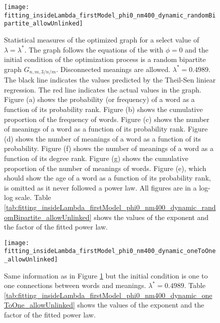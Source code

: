 \begin{figure}
  \centering
  \texttt{[image: fitting\_insideLambda\_firstModel\_phi0\_nm400\_dynamic\_randomBipartite\_allowUnlinked]}
  \caption{
    Statistical measures of the optimized graph for a select value of $\lambda=\lambda^*$.
    The graph follows the equations of the \firstmodel{} with $\phi=0$ and the initial condition of the optimization process is a random bipartite graph $G_{n,m,3/n/m}$. Disconnected meanings are allowed.
    $\lambda^*=0.4989$.
    The black line indicates the values predicted by the Theil-Sen liniear regression.
    The red line indicates the actual values in the graph.
    Figure (a) shows the probability (or frequency) of a word as a function of its probability rank.
    Figure (b) shows the cumulative proportion of the frequency of words.
    Figure (c) shows the number of meanings of a word as a function of its probability rank.
    Figure (d) shows the number of meanings of a word as a function of its probability.
    Figure (f) shows the number of meanings of a word as a function of its degree rank.
    Figure (g) shows the cumulative proportion of the number of meanings of words.
    Figure (e), which should show the age of a word as a function of its probability rank, is omitted as it never followed a power law.
    All figures are in a log-log scale.
    Table \ref{tab:fitting_insideLambda_firstModel_phi0_nm400_dynamic_randomBipartite_allowUnlinked} shows the values of the exponent and the factor of the fitted power law.
  }
  \label{fig:fitting_insideLambda_firstModel_phi0_nm400_dynamic_randomBipartite_allowUnlinked}
\end{figure}

\begin{figure}
  \centering
  \texttt{[image: fitting\_insideLambda\_firstModel\_phi0\_nm400\_dynamic\_oneToOne\_allowUnlinked]}
  \caption{Same information as in Figure \ref{fig:fitting_insideLambda_firstModel_phi0_nm400_dynamic_randomBipartite_allowUnlinked} but the initial condition is one to one connections between words and meanings. $\lambda^*=0.
4989$.
Table \ref{tab:fitting_insideLambda_firstModel_phi0_nm400_dynamic_oneToOne_allowUnlinked} shows the values of the exponent and the factor of the fitted power law.}
  \label{fig:fitting_insideLambda_firstModel_phi0_nm400_dynamic_oneToOne_allowUnlinked}
\end{figure}



